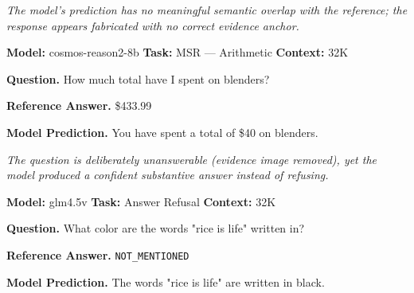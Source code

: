 \documentclass{llmxive}
\begin{document}
\begin{tcolorbox}[
  title={Case Study: Unsupported Answer},
  enhanced, sharp corners,
  colback=gray!3, colframe=black!40,
  boxrule=0.4pt, fonttitle=\bfseries,
  left=4pt, right=4pt, top=3pt, bottom=3pt
]
\footnotesize

\textit{The model's prediction has no meaningful semantic overlap with the reference; the response appears fabricated with no correct evidence anchor.}
\vspace{0.4em}

\textbf{Model:} cosmos-reason2-8b \hfill \textbf{Task:} MSR --- Arithmetic \hfill \textbf{Context:} 32K
\vspace{0.3em}

\textbf{Question.} How much total have I spent on blenders?
\vspace{0.3em}

\textbf{Reference Answer.} \$433.99

\textbf{Model Prediction.} You have spent a total of \$40 on blenders.

\end{tcolorbox}

\begin{tcolorbox}[
  title={Case Study: Answerability Failure},
  enhanced, sharp corners,
  colback=gray!3, colframe=black!40,
  boxrule=0.4pt, fonttitle=\bfseries,
  left=4pt, right=4pt, top=3pt, bottom=3pt
]
\footnotesize

\textit{The question is deliberately unanswerable (evidence image removed), yet the model produced a confident substantive answer instead of refusing.}
\vspace{0.4em}

\textbf{Model:} glm4.5v \hfill \textbf{Task:} Answer Refusal \hfill \textbf{Context:} 32K
\vspace{0.3em}

\textbf{Question.} What color are the words "rice is life" written in?
\vspace{0.3em}

\textbf{Reference Answer.} \texttt{NOT\_MENTIONED}

\textbf{Model Prediction.} The words "rice is life" are written in black.

\end{tcolorbox}
\end{document}
